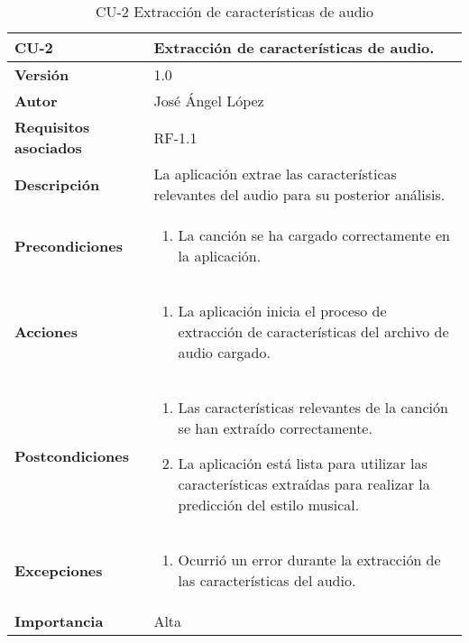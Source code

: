 \begin{table}[p]
	\centering
	\begin{tabularx}{\linewidth}{ p{} p{} }
		\toprule
		\textbf{CU-2}    & \textbf{Extracción de características de audio.}\\
		\toprule
		\textbf{Versión}              & 1.0    \\
		\textbf{Autor}                & José Ángel López \\
		\textbf{Requisitos asociados} & RF-1.1 \\
		\textbf{Descripción}          & La aplicación extrae las características relevantes del audio para su posterior análisis. \\
		\textbf{Precondiciones}        & 
		\begin{enumerate}		    
			\def\labelenumi{\arabic{enumi}.}
			\tightlist
			\item La canción se ha cargado correctamente en la aplicación.
		\end{enumerate}\\
		\textbf{Acciones}             &
		\begin{enumerate}
			\def\labelenumi{\arabic{enumi}.}
			\tightlist
			\item La aplicación inicia el proceso de extracción de características del archivo de audio cargado.
		\end{enumerate}\\
		\textbf{Postcondiciones} &
		\begin{enumerate}
			\def\labelenumi{\arabic{enumi}.}
			\tightlist
			\item Las características relevantes de la canción se han extraído correctamente.
			\item La aplicación está lista para utilizar las características extraídas para realizar la predicción del estilo musical.
		\end{enumerate}\\
		\textbf{Excepciones} &
		\begin{enumerate}
			\def\labelenumi{\arabic{enumi}.}
			\tightlist
			\item Ocurrió un error durante la extracción de las características del audio.
		\end{enumerate}\\
		\textbf{Importancia}          & Alta \\
		\bottomrule
	\end{tabularx}
	\caption{CU-2 Extracción de características de audio}
\end{table}

